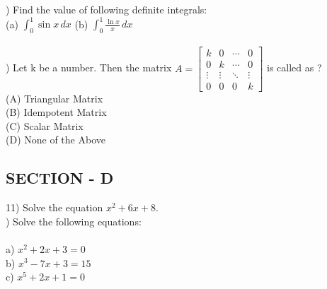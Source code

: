 \documentclass[12pt]{article}
\begin{document}
) Find the value of following definite integrals:\\

(a) \( \int_{0}^{1} \sin x \, dx \) \hspace{15mm} (b) \( \int_{0}^{1} \frac{\ln x}{x} \, dx \)\\\\

) Let k be a number. Then the matrix $A = \begin{bmatrix}
k & 0 & \cdots & 0\\
0 & k & \cdots & 0\\
\vdots & \vdots & \ddots & \vdots\\
0 & 0 & 0 & k
\end{bmatrix}$ is called as ?\\

\indent(A) Triangular Matrix\\
\indent(B) Idempotent Matrix\\
\indent(C) Scalar Matrix\\
\indent(D) None of the Above

\subsection{SECTION - D}
11) Solve the equation $x^2 + 6x + 8$.\\

) Solve the following equations:\\\\
{a) $x^2 + 2x + 3 = 0$\\
b) $x^3 - 7x + 3 = 15$\\
c) $x^5 + 2x + 1 = 0$}
\end{document}
